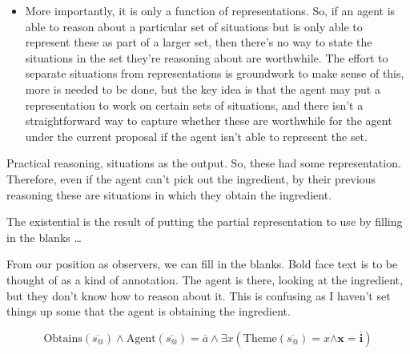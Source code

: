 \documentclass[10pt]{article}
\begin{document}
\begin{itemize}
\item More importantly, it is only a function of representations.
  So, if an agent is able to reason about a particular set of situations but is only able to represent these as part of a larger set, then there's no way to state the situations in the set they're reasoning about are worthwhile.
  The effort to separate situations from representations is groundwork to make sense of this, more is needed to be done, but the key idea is that the agent may put a representation to work on certain sets of situations, and there isn't a straightforward way to capture whether these are worthwhile for the agent under the current proposal if the agent isn't able to represent the set.
\end{itemize}


\newpage


Practical reasoning, situations as the output.
So, these had some representation.
Therefore, even if the agent can't pick out the ingredient, by their previous reasoning these are situations in which they obtain the ingredient.

\newpage






The existential is the result of putting the partial representation to use by filling in the blanks \dots

From our position as observers, we can fill in the blanks.
Bold face text is to be thought of as a kind of annotation.
The agent is there, looking at the ingredient, but they don't know how to reason about it.
{\color{red} This is confusing as I haven't set things up some that the agent is obtaining the ingredient.}

\[
  \text{Obtains}(\overline{s_{@}}) \land
  \text{Agent}(\overline{s_{@}}) = \overline{a} \land
  \exists x(\text{Theme}(\overline{s_{@}}) = x \bm{\land x = \overline{i}})
\]



\end{document}
